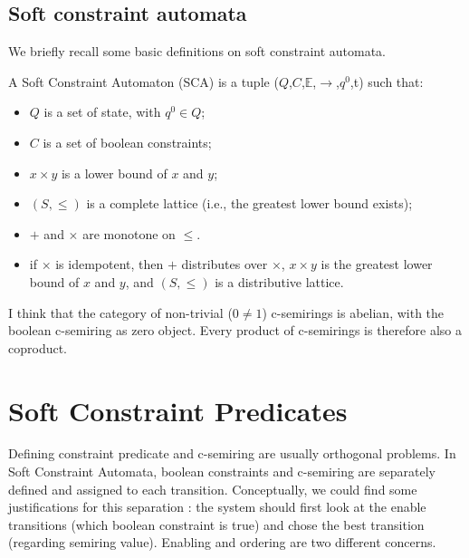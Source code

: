 \documentclass[runningheads]{llncs}
\newcommand{\ctimes}{\times}
\newcommand{\cplus}{+}
\begin{document}
\subsection{Soft constraint automata}
\label{sec:sca}

We briefly recall some basic definitions on soft constraint automata.

\begin{definition}
	\label{defn:sca}
	A Soft Constraint Automaton (SCA) is a tuple ($Q$,$C$,$\mathbb{E}$,$\rightarrow$,$q^{0}$,t) such that:
	
\begin{itemize}
    \item $Q$ is a set of state, with $q^0 \in Q$; 
    \item $C$ is a set of boolean constraints;
    \item $x \ctimes y$ is a lower bound of $x$ and $y$;
    \item $(S,\leq)$ is a complete lattice (i.e., the greatest lower bound exists);
    \item $\cplus$ and $\ctimes$ are monotone on $\leq$.
    \item if $\ctimes$ is idempotent, then $\cplus$ distributes over $\ctimes$, $x \ctimes y$ is the greatest lower bound of $x$ and $y$, and $(S,\leq)$ is a distributive lattice.
\end{itemize}

\end{definition}

I think that the category of non-trivial ($0 \neq 1$) c-semirings is abelian, with the boolean c-semiring as zero object.
Every product of c-semirings is therefore also a coproduct.


\section{Soft Constraint Predicates}
\label{sec:predicates}
Defining constraint predicate and c-semiring are usually orthogonal problems. In Soft Constraint Automata, boolean constraints and c-semiring are separately defined and assigned to each transition. Conceptually, we could find some justifications for this separation : the system should first look at the enable transitions (which boolean constraint is true) and chose the best transition (regarding semiring value). Enabling and ordering are two different concerns. 
\end{document}
